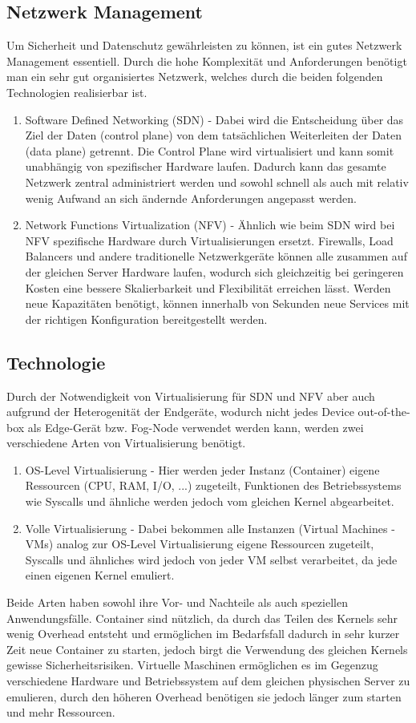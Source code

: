 \documentclass[conference]{IEEEtran}
\begin{document}
\subsection{Netzwerk Management}
Um Sicherheit und Datenschutz gewährleisten zu können, ist ein gutes Netzwerk Management essentiell. Durch die hohe Komplexität und Anforderungen benötigt man ein sehr gut organisiertes Netzwerk, welches durch die beiden folgenden Technologien realisierbar ist.
\begin{enumerate}
	\item Software Defined Networking (SDN) - Dabei wird die Entscheidung über das Ziel der Daten (control plane) von dem tatsächlichen Weiterleiten der Daten (data plane) getrennt. Die Control Plane wird virtualisiert und kann somit unabhängig von spezifischer Hardware laufen. Dadurch kann das gesamte Netzwerk zentral administriert werden und sowohl schnell als auch mit relativ wenig Aufwand an sich ändernde Anforderungen angepasst werden.
	\item Network Functions Virtualization (NFV) - Ähnlich wie beim SDN wird bei NFV spezifische Hardware durch Virtualisierungen ersetzt. Firewalls, Load Balancers und andere traditionelle Netzwerkgeräte können alle zusammen auf der gleichen Server Hardware laufen, wodurch sich gleichzeitig bei geringeren Kosten eine bessere Skalierbarkeit und Flexibilität erreichen lässt. Werden neue Kapazitäten benötigt, können innerhalb von Sekunden neue Services mit der richtigen Konfiguration bereitgestellt werden.
\end{enumerate}

\subsection{Technologie}
Durch der Notwendigkeit von Virtualisierung für SDN und NFV aber auch aufgrund der Heterogenität der Endgeräte, wodurch nicht jedes Device out-of-the-box als Edge-Gerät bzw. Fog-Node verwendet werden kann, werden zwei verschiedene Arten von Virtualisierung benötigt.
\begin{enumerate}
	\item OS-Level Virtualisierung - Hier werden jeder Instanz (Container) eigene Ressourcen (CPU, RAM, I/O, ...) zugeteilt, Funktionen des Betriebssystems wie Syscalls und ähnliche werden jedoch vom gleichen Kernel abgearbeitet. 
	\item Volle Virtualisierung - Dabei bekommen alle Instanzen (Virtual Machines - VMs) analog zur OS-Level Virtualisierung eigene Ressourcen zugeteilt, Syscalls und ähnliches wird jedoch von jeder VM selbst verarbeitet, da jede einen eigenen Kernel emuliert.
\end{enumerate}
Beide Arten haben sowohl ihre Vor- und Nachteile als auch speziellen Anwendungsfälle. Container sind nützlich, da durch das Teilen des Kernels sehr wenig Overhead entsteht und ermöglichen im Bedarfsfall dadurch in sehr kurzer Zeit neue Container zu starten, jedoch birgt die Verwendung des gleichen Kernels gewisse Sicherheitsrisiken. Virtuelle Maschinen ermöglichen es im Gegenzug verschiedene Hardware und Betriebssystem auf dem gleichen physischen Server zu emulieren, durch den höheren Overhead benötigen sie jedoch länger zum starten und mehr Ressourcen.
\end{document}
